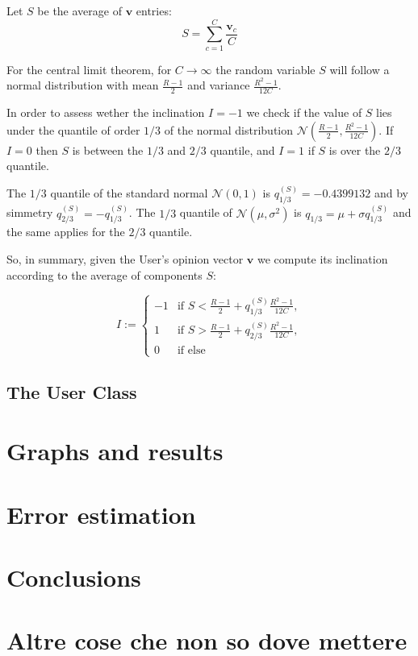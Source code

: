 \documentclass[11pt,a4paper]{article}
\begin{document}
Let $S$ be the average of $\mathbf{v}$ entries:
$$ S = \sum_{c=1}^{C} \frac{ \mathbf{v}_c }{ C } $$ 

For the central limit theorem, for $C \rightarrow \infty$ the random variable $S$ will follow a normal distribution with mean $\frac{R-1}{2}$ and variance ${\frac  {R^{2}-1}{12C}}$.

In order to assess wether the inclination $I=-1$ we check if the value of $S$ lies under the quantile of order $1/3$ of the normal distribution ${\mathcal {N}}( \frac{R-1}{2} , {\frac  {R^{2}-1}{12C}})$. If $I=0$ then $S$ is between the $1/3$ and $2/3$ quantile, and $I=1$ if $S$ is over the $2/3$ quantile.

The $1/3$ quantile of the standard normal ${\mathcal {N}}(0,1)$ is $q_{1/3}^{(S)} = -0.4399132$ and by simmetry $q_{2/3}^{(S)} = - q_{1/3}^{(S)} $. The $1/3$ quantile of ${\mathcal {N}}(\mu ,\sigma ^{2})$ is $q_{1/3} = \mu + \sigma q_{1/3}^{(S)}$ and the same applies for the $2/3$ quantile. 

So, in summary, given the User's opinion vector $\mathbf{v}$ we compute its inclination according to the average of components $S$: 

$$  I :={\begin{cases}-1&{\text{if }} S < \frac{R-1}{2} +  q_{1/3}^{(S)} \frac  {R^{2}-1}{12C},
\\1&{\text{if }}  S > \frac{R-1}{2} +  q_{2/3}^{(S)} \frac  {R^{2}-1}{12C},
\\0&{\text{if else }} \end{cases}}  $$
  

\subsection{The User Class}
	





\section{Graphs and results}

\section{Error estimation}

\section{Conclusions}

\section{Altre cose che non so dove mettere}


\begin{comment}

\begin{center}
\texttt{[image: exe1\_smd.pdf]}
\end{center}
\newpage 

\end{comment}
\end{document}
